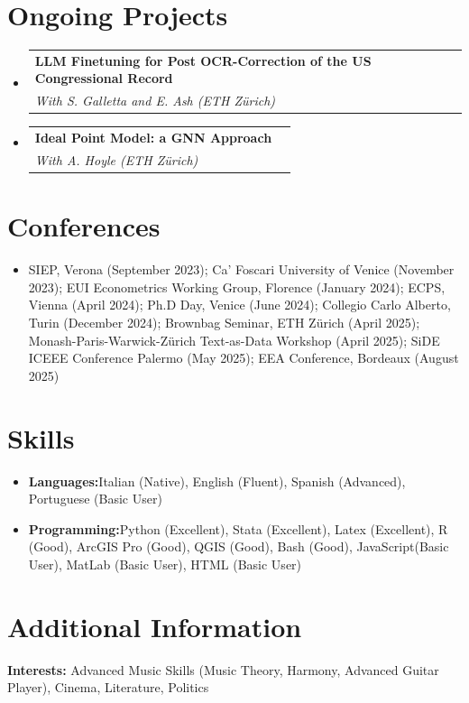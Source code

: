 \documentclass[a4paper,11pt]{article}
\makeatletter
\newcommand{\resumeItem}[2]{
  \item{
    \textbf{#1}{\hspace{0.5mm}#2 \vspace{-0.5mm}}
  }
}
\newcommand{\resumeProject}[4]{
\vspace{0.1mm}\item[]
    \begin{tabular*}{0.98\textwidth}[t]{l@{\extracolsep{\fill}}r}
        \textbf{#1} & \textit{\footnotesize{#3}} \\
        \footnotesize{\textit{#2}} & \footnotesize{#4}
    \end{tabular*}
    \vspace{-2.4mm}
}
\newcommand{\resumeSubItem}[2]{\resumeItem{#1}{#2}\vspace{-4pt}}
\newcommand{\resumeSubHeadingListStart}{\begin{itemize}[leftmargin=*,labelsep=1mm]}
\newcommand{\resumeHeadingSkillStart}{\begin{itemize}[leftmargin=*,itemsep=1.7mm, rightmargin=2ex]}
\newcommand{\resumeSubHeadingListEnd}{\end{itemize}\vspace{0.5mm}} %
\newcommand{\resumeHeadingSkillEnd}{\end{itemize}\vspace{-0.5mm}}
\makeatother
\begin{document}
\section{\textbf{Ongoing Projects}}
\vspace{-0.4mm}
\resumeSubHeadingListStart

\resumeProject
{LLM Finetuning for Post OCR-Correction of the US Congressional Record} %
{With S. Galletta and E. Ash (ETH Zürich)}          %
{}                                                   
{}                                                    %

\resumeProject
{Ideal Point Model: a GNN Approach} %
{With A. Hoyle (ETH Zürich)}      %
{}                               
{}                                


\resumeSubHeadingListEnd

\section{\textbf{Conferences}}
\vspace{-0.4mm}
\begin{itemize}[leftmargin=*]
\item[] \small{SIEP, Verona (September 2023); Ca' Foscari University of Venice (November 2023); EUI Econometrics Working Group, Florence (January 2024); ECPS, Vienna (April 2024); Ph.D Day, Venice (June 2024); Collegio Carlo Alberto, Turin (December 2024); Brownbag Seminar, ETH Zürich (April 2025); Monash-Paris-Warwick-Zürich Text-as-Data Workshop (April 2025); SiDE ICEEE Conference Palermo (May 2025); EEA Conference, Bordeaux (August 2025)}
\end{itemize}
\vspace{2mm}

\section{\textbf{Skills}}
\vspace{-0.4mm}
\resumeHeadingSkillStart
\resumeSubItem{Languages:}
{Italian (Native), English (Fluent), Spanish (Advanced), Portuguese (Basic User)}
\resumeSubItem{Programming:}
{Python (Excellent), Stata (Excellent),  Latex (Excellent), R (Good), ArcGIS Pro (Good), QGIS (Good), Bash (Good),  JavaScript(Basic User), MatLab (Basic User), HTML (Basic User)}
\resumeHeadingSkillEnd

\section{\textbf{Additional Information}}
\vspace{-0.4mm}
\small{
\textbf{Interests:} Advanced Music Skills (Music Theory, Harmony, Advanced Guitar Player), Cinema, Literature, Politics
}
\end{document}
